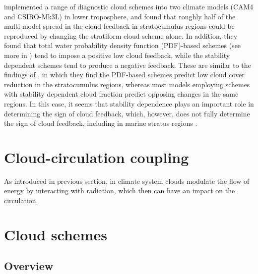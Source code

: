 
\cite{Geoffroy2017} implemented a range of diagnostic cloud schemes into two climate models (CAM4 and CSIRO-Mk3L) in lower troposphere, and found that roughly half of the multi-model spread in the cloud feedback in stratocumulus regions could be reproduced by changing the stratiform cloud scheme alone. In addition, they found that total water probability density function (PDF)-based schemes (see more in ) tend to impose a positive low cloud feedback, while the stability dependent schemes tend to produce a negative feedback. These are similar to the findings of \cite{Qu2014}, in which they find the PDF-based schemes predict low cloud cover reduction in the stratocumulus regions, whereas most models employing schemes with stability dependent cloud fraction predict opposing changes in the same regions. In this case, it seems that stability dependence plays an important role in determining the sign of cloud feedback, which, however, does not fully determine the sign of cloud feedback, including in marine stratus regions \citep{Geoffroy2017}.



\section{Cloud-circulation coupling}
\label{sec:cld_circulation_coupling}

As introduced in previous section, in climate system clouds modulate the flow of energy by interacting with radiation, which then can have an impact on the circulation.

\cite{Voigt2020review}

\section{Cloud schemes}
\label{sec:cld_scheme_history}
\subsection{Overview}

